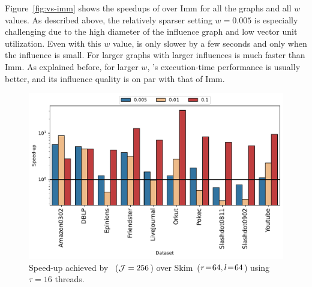 Figure~\ref{fig:vs-imm} shows the speedups of \acro over {\sc Imm} for all the graphs and all $w$ values. As described above, the relatively sparser setting $w=0.005$ is especially challenging due to the high diameter of the influence graph and low vector unit utilization. Even with this $w$ value, \acro{} is only slower by a few seconds and only when the influence is small. For larger graphs with larger influences \acro{} is much faster than {\sc Imm}. As explained before, for larger $w$, \acro{}'s execution-time performance is usually better, and its influence quality is on par with that of {\sc Imm}.
 \begin{figure}[!ht] 
     \centering
     \includegraphics[width=1\linewidth]{images/speedup-skim}
   \centering \caption{Speed-up achieved by \acro{}~(${\cal J} = 256$) over {\sc Skim}~($r\mkern1.5mu{=}\mkern1.5mu 64,l\mkern1.5mu{=}\mkern1.5mu 64$) using $\tau=16$ threads.
     \label{fig:vs-skim}} 
 \end{figure}


